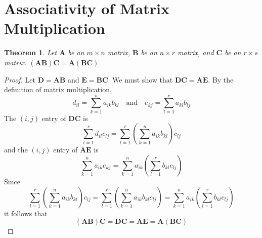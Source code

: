 \documentclass[preprint,12pt]{elsarticle}
\newcommand{\bA}{\mathbf{A}}
\newcommand{\bB}{\mathbf{B}}
\newcommand{\bC}{\mathbf{C}}
\newcommand{\bD}{\mathbf{D}}
\newcommand{\bE}{\mathbf{E}}
\newtheorem{theorem}{Theorem}[section]
\begin{document}







\section{Associativity of Matrix Multiplication}

\begin{theorem}Let $\bA{}$ be an $m\times n$ matrix, $\bB{}$ be an $n\times r$ matrix, and $\bC$ be an $r\times s$ matrix.
  $(\bA{}\bB{})\bC{}=\bA{}(\bB{}\bC{})$
\end{theorem}
\begin{proof}
  Let $\bD{}=\bA{}\bB{}$ and $\bE{}=\bB{}\bC{}$.
  We must show that $\bD{}\bC{}=\bA{}\bE{}$.
  By the definition of matrix multiplication,
  $$
  d_{il}=\sum_{k=1}^{n}a_{ik}b_{kl}\quad\text{and}\quad e_{kj}=\sum_{l=1}^{r}a_{kl}b_{lj}
  $$
  The $(i,j)$ entry of $\bD{}\bC{}$ is
  $$
  \sum_{l=1}^{r}d_{il}c_{lj}=\sum_{l=1}^{r}\left(\sum_{k=1}^{n}a_{ik}b_{kl}\right)c_{lj}
  $$
  and the $(i,j)$ entry of $\bA{}\bE{}$ is
  $$
  \sum_{k=1}^{n}a_{ik}e_{kj}=\sum_{k=1}^{n}a_{ik}\left(\sum_{l=1}^{r}b_{kl}c_{lj}\right)
  $$
  Since
  $$
  \sum_{l=1}^{r}\left(\sum_{k=1}^{n}a_{ik}b_{kl}\right)c_{lj}
  =\sum_{l=1}^{r}\left(\sum_{k=1}^{n}a_{ik}b_{kl}c_{lj}\right)
  = \sum_{k=1}^{n}a_{ik}\left(\sum_{l=1}^{r}b_{kl}c_{lj}\right)
  $$
  it follows that
  $$
  (\bA{}\bB{})\bC{}=\bD{}\bC{}=\bA\bE{}=\bA{}(\bB{}\bC{})
  $$
\end{proof}
\end{document}

